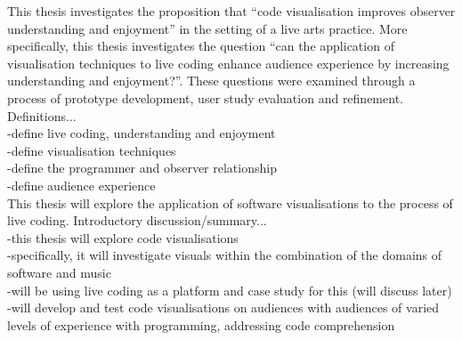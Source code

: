 This thesis investigates the proposition that ``code visualisation improves observer understanding and enjoyment'' in the setting of a live arts practice. More specifically, this thesis investigates the question ``can the application of visualisation techniques to live coding enhance audience experience by increasing understanding and enjoyment?''. These questions were examined through a process of prototype development, user study evaluation and refinement.\\

Definitions...\\
-define live coding, understanding and enjoyment\\
-define visualisation techniques\\
-define the programmer and observer relationship\\
-define audience experience\\

This thesis will explore the application of software visualisations to the process of live coding.
Introductory discussion/summary...\\
-this thesis will explore code visualisations\\
-specifically, it will investigate visuals within the combination of the domains of software and music\\
-will be using live coding as a platform and case study for this (will discuss later)\\
-will develop and test code visualisations on audiences with audiences of varied levels of experience with programming, addressing code comprehension\\






